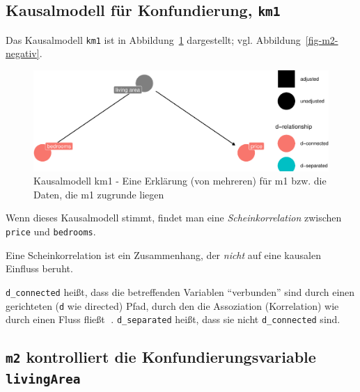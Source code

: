 \documentclass[
  a4paper,
  DIV=11]{scrreprt}
\theoremstyle{definition}
\theoremstyle{remark}
\begin{document}
\hypertarget{kausalmodell-fuxfcr-konfundierung-km1}{%
\subsection{\texorpdfstring{Kausalmodell für Konfundierung,
\texttt{km1}}{Kausalmodell für Konfundierung, km1}}\label{kausalmodell-fuxfcr-konfundierung-km1}}

Das Kausalmodell \texttt{km1} ist in Abbildung~\ref{fig-km1}
dargestellt; vgl. Abbildung~\ref{fig-m2-negativ}.

\begin{figure}

{\centering \includegraphics{./kausal_files/figure-pdf/fig-km1-1.pdf}

}

\caption{\label{fig-km1}Kausalmodell km1 - Eine Erklärung (von mehreren)
für m1 bzw. die Daten, die m1 zugrunde liegen}

\end{figure}

Wenn dieses Kausalmodell stimmt, findet man eine
\emph{Scheinkorrelation} zwischen \texttt{price} und \texttt{bedrooms}.

Eine Scheinkorrelation ist ein Zusammenhang, der \emph{nicht} auf eine
kausalen Einfluss beruht.

\texttt{d\_connected} heißt, dass die betreffenden Variablen
``verbunden'' sind durch einen gerichteten (\texttt{d} wie directed)
Pfad, durch den die Assoziation (Korrelation) wie durch einen Fluss
fließt 🌊. \texttt{d\_separated} heißt, dass sie nicht
\texttt{d\_connected} sind.

\hypertarget{m2-kontrolliert-die-konfundierungsvariable-livingarea}{%
\subsection{\texorpdfstring{\texttt{m2} kontrolliert die
Konfundierungsvariable
\texttt{livingArea}}{m2 kontrolliert die Konfundierungsvariable livingArea}}\label{m2-kontrolliert-die-konfundierungsvariable-livingarea}}
\end{document}
